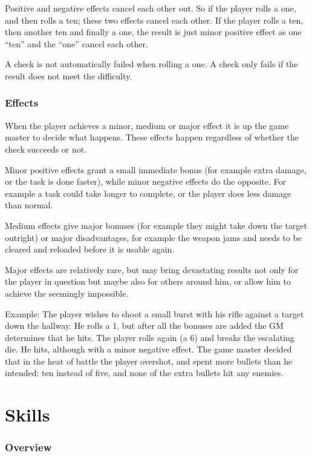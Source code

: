 \documentclass[11pt,a4paper,openany]{scrbook}
\begin{document}
Positive and negative effects cancel each other out. So if the player rolls a
one, and then rolls a ten; these two effects cancel each other. If the player
rolls a ten, then another ten and finally a one, the result is just minor
positive effect as one ``ten'' and the ``one'' cancel each other.

A check is not automatically failed when rolling a one. A check only fails if
the result does not meet the difficulty.

\subsection{Effects}

When the player achieves a minor, medium or major effect it is up the game
master to decide what happens. These effects happen regardless of whether the
check succeeds or not.

Minor positive effects grant a small immediate bonus (for example extra
damage, or the task is done faster), while minor negative effects do the
opposite. For example a task could take longer to complete, or the player
does less damage than normal.

Medium effects give major bonuses (for example they might take down the target
outright) or major disadvantages, for example the weapon jams and needs to be
cleared and reloaded before it is usable again.

Major effects are relatively rare, but may bring devastating results not only
for the player in question but maybe also for others around him, or allow him
to achieve the seemingly impossible.

Example: The player wishes to shoot a small burst with his rifle against a
target down the hallway. He rolls a 1, but after all the bonuses are added
the GM determines that he hits. The player rolls again (a 6) and breaks the
escalating die. He hits, although with a minor negative effect. The game
master decided that in the heat of battle the player overshot, and spent
more bullets than he intended: ten instead of five, and none of the extra
bullets hit any enemies.

\chapter{Skills}

\subsection{Overview}
\end{document}
